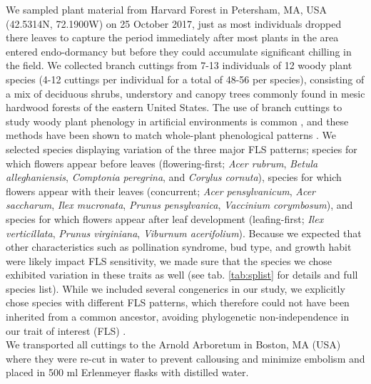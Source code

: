 \documentclass[12pt]{article}\usepackage[]{graphicx}\usepackage[]{color}
\begin{document}
\noindent We sampled plant material from Harvard Forest in Petersham, MA, USA (42.5314\degree N, 72.1900\degree W) on 25 October 2017, just as most individuals dropped there leaves to capture the period immediately after most plants in the area entered endo-dormancy but before they could accumulate significant chilling in the field. We collected branch cuttings from 7-13 individuals of 12 woody plant species (4-12 cuttings per individual for a total of 48-56 per species), consisting of a mix of deciduous shrubs, understory and canopy trees commonly found in mesic hardwood forests of the eastern United States. The use of branch cuttings to study woody plant phenology in artificial environments is common \citep{Ettinger:2020aa}, and these methods have been shown to match whole-plant phenological patterns  \citep{Vitasse:2014aa,Primack2015}.
We selected species displaying variation of the three major FLS patterns; species for which flowers appear before leaves (flowering-first; \textit{Acer rubrum}, \textit{Betula alleghaniensis}, \textit{Comptonia peregrina}, and \textit{Corylus cornuta}), species for which flowers appear with their leaves (concurrent; \textit{Acer pensylvanicum}, \textit{Acer saccharum}, \textit{Ilex mucronata}, \textit{Prunus pensylvanica}, \textit{Vaccinium corymbosum}), and species for which flowers appear after leaf development (leafing-first; \textit{Ilex verticillata}, \textit{Prunus virginiana}, \textit{Viburnum acerifolium}). Because we expected that other characteristics such as pollination syndrome, bud type, and growth habit were likely impact FLS sensitivity, we made sure that the species we chose exhibited variation in these traits as well  (see tab. \ref{tab:splist} for details and full species list). While we included several congenerics in our study, we explicitly chose species with different FLS patterns, which therefore could not have been inherited from a common ancestor, avoiding phylogenetic non-independence in our trait of interest (FLS) \citep{Revell:2010aa}.\\

We transported all cuttings to the Arnold Arboretum in Boston, MA (USA) where they were re-cut in water to prevent callousing and minimize embolism and placed in 500 ml Erlenmeyer flasks with distilled water.\\ 
\end{document}
